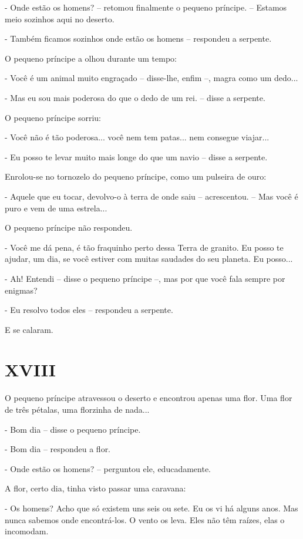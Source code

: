 - Onde estão os homens? -- retomou finalmente o pequeno príncipe. --
Estamos meio sozinhos aqui no deserto.

- Também ficamos sozinhos onde estão os homens -- respondeu a serpente.

O pequeno príncipe a olhou durante um tempo:

- Você é um animal muito engraçado -- disse-lhe, enfim --, magra como um
dedo...

- Mas eu sou mais poderosa do que o dedo de um rei. -- disse a serpente.

O pequeno príncipe sorriu:

- Você não é tão poderosa... você nem tem patas... nem consegue
viajar...

- Eu posso te levar muito mais longe do que um navio -- disse a
serpente.

Enrolou-se no tornozelo do pequeno príncipe, como um pulseira de ouro:

- Aquele que eu tocar, devolvo-o à terra de onde saiu -- acrescentou. --
Mas você é puro e vem de uma estrela...

O pequeno príncipe não respondeu.

- Você me dá pena, é tão fraquinho perto dessa Terra de granito. Eu
posso te ajudar, um dia, se você estiver com muitas saudades do seu
planeta. Eu posso...

- Ah! Entendi -- disse o pequeno príncipe --, mas por que você fala
sempre por enigmas?

- Eu resolvo todos eles -- respondeu a serpente.

E se calaram.

\chapter{XVIII}

O pequeno príncipe atravessou o deserto e encontrou apenas uma flor. Uma
flor de três pétalas, uma florzinha de nada...

- Bom dia -- disse o pequeno príncipe.

- Bom dia -- respondeu a flor.

- Onde estão os homens? -- perguntou ele, educadamente.

A flor, certo dia, tinha visto passar uma caravana:

- Os homens? Acho que só existem uns seis ou sete. Eu os vi há alguns
anos. Mas nunca sabemos onde encontrá-los. O vento os leva. Eles não têm
raízes, elas o incomodam.

